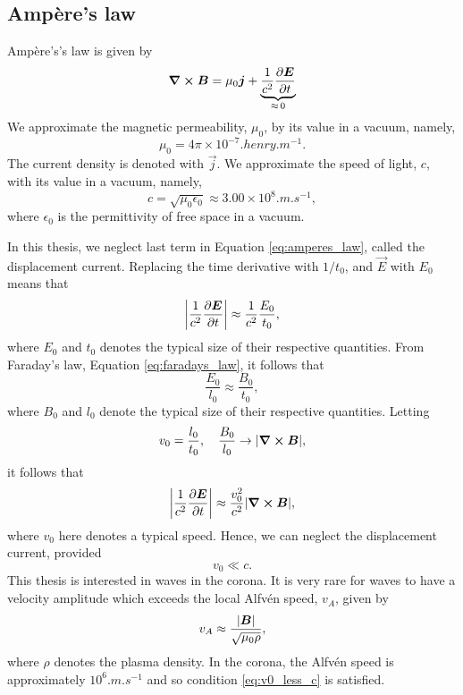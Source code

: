 \subsection{Amp\`ere's law}
\label{sec:amperes_law}

Amp\`ere's's law is given by
\begin{equation}
    \label{eq:amperes_law}
    \curl{\boldsymbol{B}}=\mu_0\boldsymbol{j}+\underbrace{\frac{1}{c^2}\pdv{\boldsymbol{E}}{t}}_{\approx\,0}
\end{equation}
We approximate the magnetic permeability, $\mu_0$, by its value in a vacuum, namely,
\[\mu_0=4\pi\times10^{-7}\si{.henry.m^{-1}}.\]
The current density is denoted with $\vec{j}$. We approximate the speed of light, $c$, with its value in a vacuum, namely,
\[c=\sqrt{\mu_0\epsilon_0}\approx3.00\times10^8\si{.m.s^{-1}},\]
where $\epsilon_0$ is the permittivity of free space in a vacuum. 

In this thesis, we neglect last term in Equation \eqref{eq:amperes_law}, called the displacement current. Replacing the time derivative with $1/t_0$, and $\vec{E}$ with $E_0$ means that
\[\abs{\frac{1}{c^2}\pdv{\boldsymbol{E}}{t}}\approx\frac{1}{c^2}\frac{E_0}{t_0},\]
where $E_0$ and $t_0$ denotes the typical size of their respective quantities. From Faraday's law, Equation \eqref{eq:faradays_law}, it follows that
\[\frac{E_0}{l_0}\approx \frac{B_0}{t_0},\]
where $B_0$ and $l_0$ denote the typical size of their respective quantities. Letting
\[v_0=\frac{l_0}{t_0},\quad \frac{B_0}{l_0}\rightarrow|\curl\boldsymbol{B}|,\]
it follows that
\[\abs{\frac{1}{c^2}\pdv{\boldsymbol{E}}{t}}\approx\frac{v_0^2}{c^2}\abs{\curl{\boldsymbol{B}}},\]
where $v_0$ here denotes a typical speed. Hence, we can neglect the displacement current, provided
\begin{equation}
    \label{eq:v0_less_c}
    v_0\ll c.
\end{equation}
This thesis is interested in waves in the corona. It is very rare for waves to have a velocity amplitude which exceeds the local Alfv\'en speed, $v_A$, given by
\begin{equation}
    v_A\approx\frac{\abs{\boldsymbol{B}}}{\sqrt{{\mu}_0\rho}},
\end{equation}
where $\rho$ denotes the plasma density. In the corona, the Alfv\'en speed is approximately $10^6\si{.m.s^{-1}}$ and so condition \eqref{eq:v0_less_c} is satisfied.


